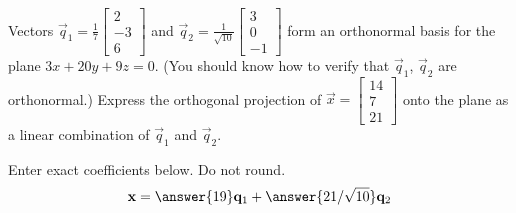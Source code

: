 \documentclass{ximera}
\author{}
\begin{document}
\begin{exercise}
Vectors $\vec{q}_1=\frac{1}{7}\begin{bmatrix}2\\-3\\6\end{bmatrix}$ and $\vec{q}_2=\frac{1}{\sqrt{10}}\begin{bmatrix}3\\0\\-1\end{bmatrix}$ form an orthonormal basis for the plane $3x+20y+9z=0$.  (You should know how to verify that $\vec{q}_1$, $\vec{q}_2$ are orthonormal.)  Express the orthogonal projection of $\vec{x}=\begin{bmatrix}14\\7\\21\end{bmatrix}$ onto the plane as a linear combination of $\vec{q}_1$ and $\vec{q}_2$.

Enter exact coefficients below.  Do not round.
$$\vec{x}=\answer{19}\vec{q}_1+\answer{21/\sqrt{10}}\vec{q}_2$$
 \end{exercise}
 
\end{document}
